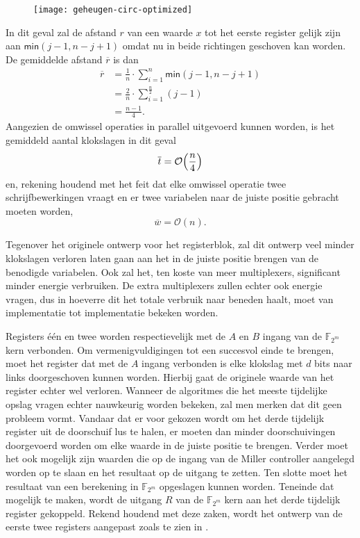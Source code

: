 \begin{figure}[h]
	\centering
		\texttt{[image: geheugen-circ-optimized]}
\end{figure}

In dit geval zal de afstand $r$ van een waarde $x$ tot het eerste register gelijk zijn aan $\textsf{min}(j - 1, n - j + 1)$ omdat nu in beide richtingen geschoven kan worden. De gemiddelde afstand $\overline{r}$ is dan
\[\begin{aligned}
\overline{r}	&= \frac{1}{n} \cdot \sum_{i = 1}^{n} \textsf{min}(j - 1, n - j + 1)\\
	&= \frac{2}{n} \cdot \sum_{i = 1}^{\frac{n}{2}} (j - 1)\\
	&= \frac{n - 1}{4}.
\end{aligned}\]
Aangezien de omwissel operaties in parallel uitgevoerd kunnen worden, is het gemiddeld aantal klokslagen in dit geval
\[\overline{t} = \mathcal{O}  \Bigl( \frac{n}{4} \Bigr)\]
en, rekening houdend met het feit dat elke omwissel operatie twee schrijfbewerkingen vraagt en er twee variabelen naar de juiste positie gebracht moeten worden,
\[\overline{w} = \mathcal{O}(n).\]

Tegenover het originele ontwerp voor het registerblok, zal dit ontwerp veel minder klokslagen verloren laten gaan aan het in de juiste positie brengen van de benodigde variabelen. Ook zal het, ten koste van meer multiplexers, significant minder energie verbruiken. De extra multiplexers zullen echter ook energie vragen, dus in hoeverre dit het totale verbruik naar beneden haalt, moet van implementatie tot implementatie bekeken worden. 

Registers \'e\'en en twee worden respectievelijk met de $A$ en $B$ ingang van de $\mathbb{F}_{2^m}$ kern verbonden. Om vermenigvuldigingen tot een succesvol einde te brengen, moet het register dat met de $A$ ingang verbonden is elke klokslag met $d$ bits naar links doorgeschoven kunnen worden. Hierbij gaat de originele waarde van het register echter wel verloren. Wanneer de algoritmes die het meeste tijdelijke opslag vragen echter nauwkeurig worden bekeken, zal men merken dat dit geen probleem vormt. Vandaar dat er voor gekozen wordt om het derde tijdelijk register uit de doorschuif lus te halen, er moeten dan minder doorschuivingen doorgevoerd worden om elke waarde in de juiste positie te brengen. Verder moet het ook mogelijk zijn waarden die op de ingang van de Miller controller aangelegd worden op te slaan en het resultaat op de uitgang te zetten. Ten slotte moet het resultaat van een berekening in $\mathbb{F}_{2^m}$ opgeslagen kunnen worden. Teneinde dat mogelijk te maken, wordt de uitgang $R$ van de $\mathbb{F}_{2^m}$ kern aan het derde tijdelijk register gekoppeld. Rekend houdend met deze zaken, wordt het ontwerp van de eerste twee registers aangepast zoals te zien in .

